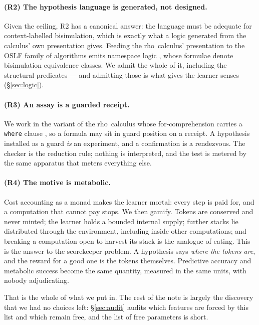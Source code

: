 \documentclass[11pt]{article}
\theoremstyle{plain}
\theoremstyle{definition}
\newcommand{\rhoc}{\textsf{rho}}
\begin{document}
\paragraph{(R2) The hypothesis language is generated, not designed.} Given the ceiling, R2 has a
canonical answer: the language must be adequate for context-labelled bisimulation, which is exactly
what a logic generated from the calculus' own presentation gives. Feeding the \rhoc\ calculus'
presentation to the OSLF family of algorithms \cite{OSLF} emits namespace logic
\cite{NamespaceLogic}, whose formulae denote bisimulation equivalence classes. We admit the whole of
it, including the structural predicates --- and admitting those is what gives the learner senses
(\S\ref{sec:logic}).

\paragraph{(R3) An assay is a guarded receipt.} We work in the variant of the \rhoc\ calculus whose
for-comprehension carries a \texttt{where} clause \cite[\S9]{Omnibus}, so a formula may sit in guard
position on a receipt. A hypothesis installed as a guard \emph{is} an experiment, and a confirmation
is a rendezvous. The checker is the reduction rule; nothing is interpreted, and the test is metered by
the same apparatus that meters everything else.

\paragraph{(R4) The motive is metabolic.} Cost accounting as a monad \cite{CostMonad} makes the
learner mortal: every step is paid for, and a computation that cannot pay stops. We then gamify.
Tokens are conserved and never minted; the learner holds a bounded internal supply; further stacks lie
distributed through the environment, including inside other computations; and breaking a computation
open to harvest its stack is the analogue of eating. This is the answer to the scorekeeper problem. A
hypothesis says \emph{where the tokens are}, and the reward for a good one is the tokens themselves.
Predictive accuracy and metabolic success become the same quantity, measured in the same units, with
nobody adjudicating.

\medskip
\noindent That is the whole of what we put in. The rest of the note is largely the discovery that we
had no choices left: \S\ref{sec:audit} audits which features are forced by this list and which remain
free, and the list of free parameters is short.
\end{document}
